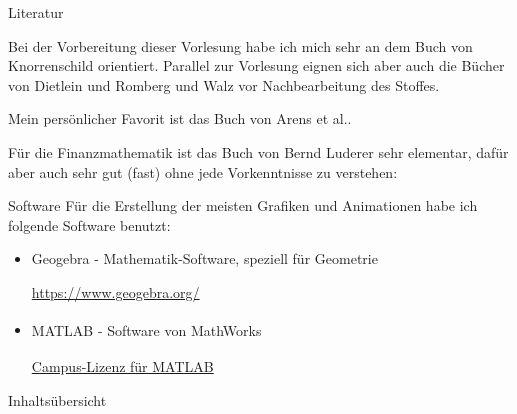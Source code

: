 \begin{frame}{Literatur}
\footnotesize{Bei der Vorbereitung dieser Vorlesung habe ich mich sehr an dem Buch von Knorrenschild \cite{knorr-mathe} orientiert. Parallel zur Vorlesung eignen sich aber auch die Bücher von Dietlein und Romberg \cite{diet-panik} und Walz \cite{walz-mathe} vor Nachbearbeitung des Stoffes.

Mein persönlicher Favorit ist das Buch von Arens et al.\cite{arens-mathe}.

Für die Finanzmathematik ist das Buch von Bernd Luderer sehr elementar, dafür aber auch sehr gut (fast) ohne jede Vorkenntnisse zu verstehen: \cite{luderer-starthilfe}

\printbibliography
}
\end{frame}

\begin{frame}{Software}
	Für die Erstellung der meisten Grafiken und Animationen habe ich folgende Software benutzt:
	\begin{itemize}
		\item Geogebra - Mathematik-Software, speziell für Geometrie
		
		\href{https://www.geogebra.org/}{https://www.geogebra.org/}
		\item MATLAB\textsuperscript{\textregistered} - Software von MathWorks\textsuperscript{\textregistered}
		
		\href{http://www4.fh-swf.de/de/home/studierende/its/software/matlab__campuslizenz_/matlab_campuslizenz.php}{Campus-Lizenz für MATLAB\textsuperscript{\textregistered}}
	\end{itemize}
\end{frame}

\begin{frame}{Inhaltsübersicht}
\tableofcontents
\end{frame}

